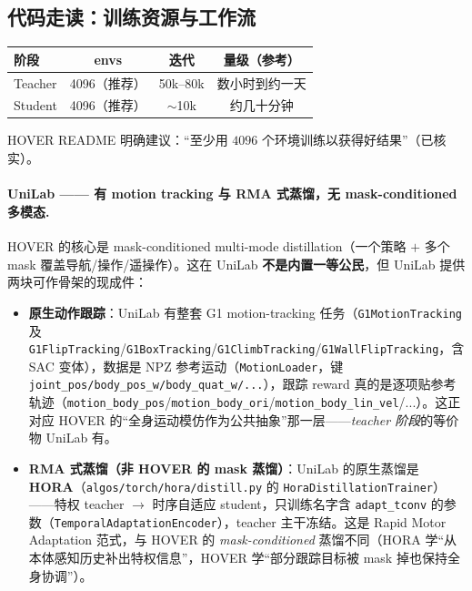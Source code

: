 \subsection{代码走读：训练资源与工作流}

\begin{center}
\small
\begin{tabular}{lccc}
\hline
阶段 & envs & 迭代 & 量级（参考） \\
\hline
Teacher & 4096（推荐） & 50k--80k & 数小时到约一天 \\
Student & 4096（推荐） & $\sim$10k & 约几十分钟 \\
\hline
\end{tabular}
\end{center}

HOVER README 明确建议：“至少用 $4096$ 个环境训练以获得好结果”（已核实）。

\paragraph{UniLab —— 有 motion tracking 与 RMA 式蒸馏，无 mask-conditioned 多模态.}
HOVER 的核心是 mask-conditioned multi-mode distillation（一个策略 $+$ 多个 mask 覆盖导航/操作/遥操作）。这在 UniLab \textbf{不是内置一等公民}，但 UniLab 提供两块可作骨架的现成件：

\begin{itemize}
  \item \textbf{原生动作跟踪}：UniLab 有整套 G1 motion-tracking 任务（\texttt{G1MotionTracking} 及 \texttt{G1FlipTracking}/\texttt{G1BoxTracking}/\texttt{G1ClimbTracking}/\texttt{G1WallFlipTracking}，含 SAC 变体），数据是 NPZ 参考运动（\texttt{MotionLoader}，键 \texttt{joint\_pos/body\_pos\_w/body\_quat\_w/...}），跟踪 reward 真的是逐项贴参考轨迹（\texttt{motion\_body\_pos}/\texttt{motion\_body\_ori}/\texttt{motion\_body\_lin\_vel}/...）。这正对应 HOVER 的“全身运动模仿作为公共抽象”那一层——\emph{teacher 阶段}的等价物 UniLab 有。
  \item \textbf{RMA 式蒸馏（非 HOVER 的 mask 蒸馏）}：UniLab 的原生蒸馏是 \textbf{HORA}（\texttt{algos/torch/hora/distill.py} 的 \texttt{HoraDistillationTrainer}）——特权 teacher $\to$ 时序自适应 student，只训练名字含 \texttt{adapt\_tconv} 的参数（\texttt{TemporalAdaptationEncoder}），teacher 主干冻结。这是 Rapid Motor Adaptation 范式，与 HOVER 的 \emph{mask-conditioned} 蒸馏不同（HORA 学“从本体感知历史补出特权信息”，HOVER 学“部分跟踪目标被 mask 掉也保持全身协调”）。
\end{itemize}

